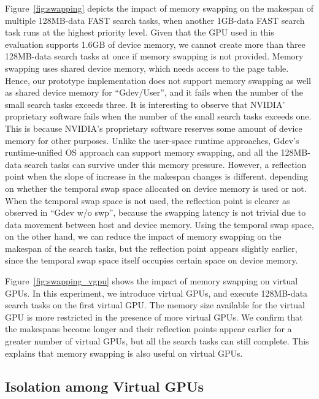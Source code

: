 Figure~\ref{fig:swapping} depicts the impact of memory swapping on the
makespan of multiple 128MB-data FAST search tasks, when another 1GB-data
FAST search task runs at the highest priority level. 
Given that the GPU used in this evaluation supports 1.6GB of device
memory, we cannot create more than three 128MB-data search tasks at once
if memory swapping is not provided.
Memory swapping uses shared device memory, which needs access to the
page table.
Hence, our prototype implementation does not support memory swapping as
well as shared device memory for ``Gdev/User'', and it fails when
the number of the small search tasks exceeds three.
It is interesting to observe that NVIDIA' proprietary software fails
when the number of the small search tasks exceeds one.
This is because NVIDIA's proprietary software reserves some
amount of device memory for other purposes.
Unlike the user-space runtime approaches, Gdev's runtime-unified OS
approach can support memory swapping, and all the 128MB-data search
tasks can survive under this memory pressure.
However, a reflection point when the slope of increase in the makespan
changes is different, depending on whether the temporal swap
space allocated on device memory is used or not.
When the temporal swap space is not used, the reflection point is
clearer as observed in ``Gdev w/o swp'', because the swapping latency is
not trivial due to data movement between host and device memory.
Using the temporal swap space, on the other hand, we can reduce the impact
of memory swapping on the makespan of the search tasks, but the
reflection point appears slightly earlier, since the temporal swap space
itself occupies certain space on device memory.

Figure~\ref{fig:swapping_vgpu} shows the impact of memory swapping on
virtual GPUs.
In this experiment, we introduce virtual GPUs, and execute 128MB-data
search tasks on the first virtual GPU.
The memory size available for the virtual GPU is more restricted in
the presence of more virtual GPUs.
We confirm that the makespans become longer and their reflection points
appear earlier for a greater number of virtual GPUs, but all the search
tasks can still complete.
This explains that memory swapping is also useful on virtual GPUs.

\vspace{-0.25em}
\subsection{Isolation among Virtual GPUs}
\vspace{-0.25em}

